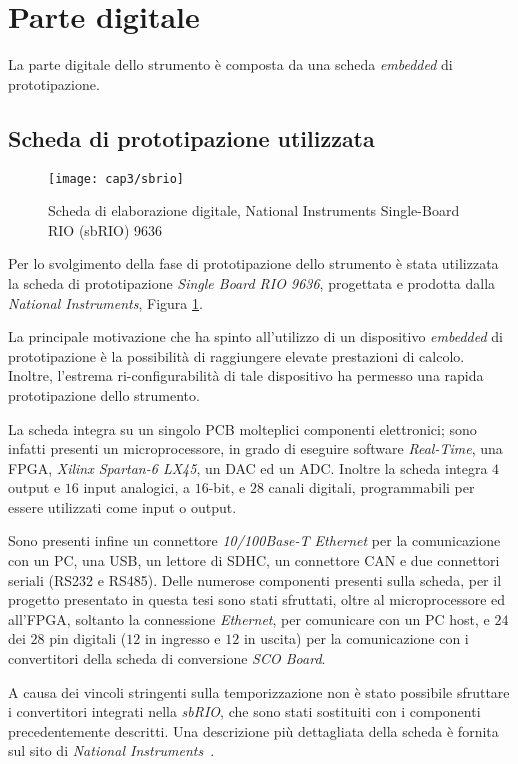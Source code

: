 \section{Parte digitale}
La parte digitale dello strumento è composta da una scheda \textit{embedded} di prototipazione. 

\subsection{Scheda di prototipazione utilizzata}
\begin{figure}  
  \begin{center}
    \texttt{[image: cap3/sbrio]}
    \caption{Scheda di elaborazione digitale, National Instruments Single-Board RIO (sbRIO) 9636}
    \label{sbrio}
  \end{center}
\end{figure}
Per lo svolgimento della fase di prototipazione dello strumento è stata utilizzata la scheda di prototipazione \textit{Single Board RIO 9636}, progettata e prodotta dalla \textit{National Instruments}, Figura \ref{sbrio}.

La principale motivazione che ha spinto all'utilizzo di un dispositivo \textit{embedded} di prototipazione è la possibilità di raggiungere elevate prestazioni di calcolo. Inoltre, l'estrema ri-configurabilità di tale dispositivo ha permesso una rapida prototipazione dello strumento.

La scheda integra su un singolo PCB molteplici componenti elettronici; sono infatti presenti un microprocessore, in grado di eseguire software \textit{Real-Time}, una FPGA, \textit{Xilinx Spartan-6 LX45}, un DAC ed un ADC. Inoltre la scheda integra $4$ output e $16$ input analogici, a $16$-bit, e $28$ canali digitali, programmabili per essere utilizzati come input o output.

Sono presenti infine un connettore \textit{10/100Base-T Ethernet} per la comunicazione con un PC, una USB, un lettore di SDHC, un connettore CAN e due connettori seriali (RS232 e RS485). Delle numerose componenti presenti sulla scheda, per il progetto presentato in questa tesi sono stati sfruttati, oltre al microprocessore ed all'FPGA, soltanto la connessione \textit{Ethernet}, per comunicare con un PC host, e $24$ dei $28$ pin digitali ($12$ in ingresso e $12$ in uscita) per la comunicazione con i convertitori della scheda di conversione \textit{SCO Board}.

A causa dei vincoli stringenti sulla temporizzazione non è stato possibile sfruttare i convertitori integrati nella \textit{sbRIO}, che sono stati sostituiti con i componenti precedentemente descritti. Una descrizione più dettagliata della scheda è fornita sul sito di \textit{National Instruments}~\cite{sitesbrio}.

